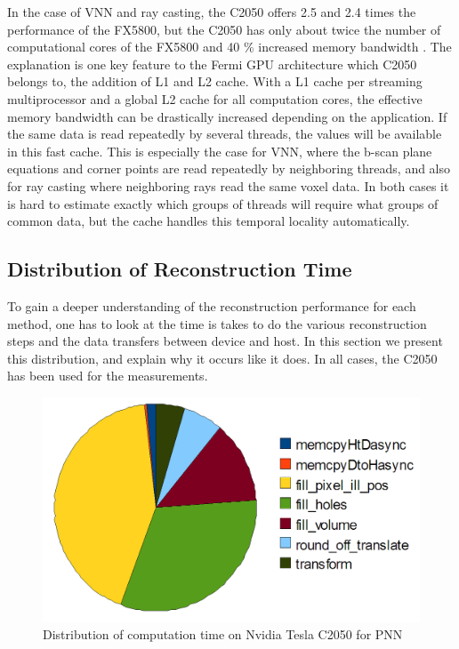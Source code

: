 	In the case of VNN and ray casting, the C2050 offers 2.5 and 2.4 times the performance of the FX5800, but the C2050 has only about twice the number of computational cores of the FX5800 and 40 \% increased memory bandwidth \cite{c2050, fx5800}. The explanation is one key feature to the Fermi GPU architecture which C2050 belongs to, the addition of L1 and L2 cache. With a L1 cache per streaming multiprocessor and a global L2 cache for all computation cores, the effective memory bandwidth can be drastically increased depending on the application. If the same data is read repeatedly by several threads, the values will be available in this fast cache. This is especially the case for VNN, where the b-scan plane equations and corner points are read repeatedly by neighboring threads, and also for ray casting where neighboring rays read the same voxel data. In both cases it is hard to estimate exactly which groups of threads will require what groups of common data, but the cache handles this temporal locality automatically.

\subsection{Distribution of Reconstruction Time}
	\label{section:time_distribution}
	
	To gain a deeper understanding of the reconstruction performance for each method, one has to look at the time is takes to do the various reconstruction steps and the data transfers between device and host. In this section we present this distribution, and explain why it occurs like it does. In all cases, the C2050 has been used for the measurements. 
	
	\begin{figure}[h]
	\centering
	\includegraphics[height=0.3\textheight]{charts/pnn.png}
	\caption[Distribution of computation time for PNN]{Distribution of computation time on Nvidia Tesla C2050 for PNN}
	\label{fig:pnn_pie}
	\end{figure}
	
